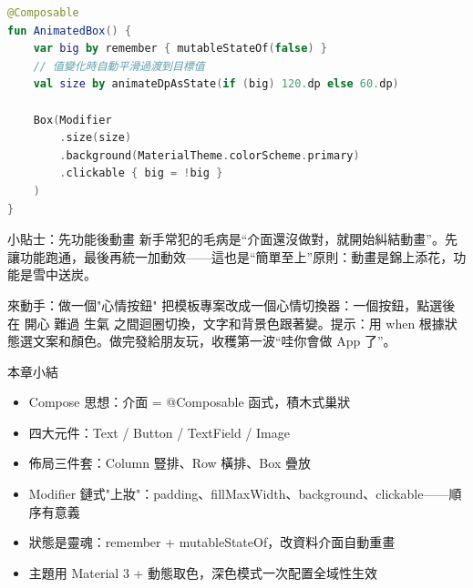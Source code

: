 \begin{lstlisting}[language=Kotlin]
@Composable
fun AnimatedBox() {
    var big by remember { mutableStateOf(false) }
    // 值變化時自動平滑過渡到目標值
    val size by animateDpAsState(if (big) 120.dp else 60.dp)

    Box(Modifier
        .size(size)
        .background(MaterialTheme.colorScheme.primary)
        .clickable { big = !big }
    )
}
\end{lstlisting}

\begin{tcbinfo}{小貼士：先功能後動畫}
新手常犯的毛病是“介面還沒做對，就開始糾結動畫”。先讓功能跑通，最後再統一加動效——這也是“簡單至上”原則：動畫是錦上添花，功能是雪中送炭。

\end{tcbinfo}

\begin{tcbpractice}{來動手：做一個"心情按鈕"}
把模板專案改成一個心情切換器：一個按鈕，點選後在 開心 難過 生氣 之間迴圈切換，文字和背景色跟著變。提示：用 when 根據狀態選文案和顏色。做完發給朋友玩，收穫第一波“哇你會做 App 了”。

\end{tcbpractice}

\begin{tcbsummary}{本章小結}
\begin{itemize}
  \item Compose 思想：介面 = @Composable 函式，積木式巢狀
  \item 四大元件：Text / Button / TextField / Image
  \item 佈局三件套：Column 豎排、Row 橫排、Box 疊放
  \item Modifier 鏈式"上妝"：padding、fillMaxWidth、background、clickable——順序有意義
  \item 狀態是靈魂：remember + mutableStateOf，改資料介面自動重畫
  \item 主題用 Material 3 + 動態取色，深色模式一次配置全域性生效
\end{itemize}

\end{tcbsummary}
